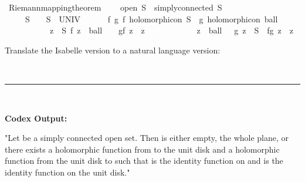 \documentclass{article}
\begin{document}
\begin{boxB}
\begin{isabelle}
\isamarkupfalse \ Riemann{\isacharunderscore}{\kern0pt}mapping{\isacharunderscore}{\kern0pt}theorem{\isacharcolon}{\kern0pt}\isanewline
\ \ \ \ {\isachardoublequoteopen}open\ S\ {\isasymand}\ simply{\isacharunderscore}{\kern0pt}connected\ S\ {\isasymlongleftrightarrow}\isanewline
\ \ \ \ \ S\ {\isacharequal}{\kern0pt}\ {\isacharbraceleft}{\kern0pt}{\isacharbraceright}{\kern0pt}\ {\isasymor}\ S\ {\isacharequal}{\kern0pt}\ UNIV\ {\isasymor}\isanewline
\ \ \ \ \ {\isacharparenleft}{\kern0pt}{\isasymexists}f\ g{\isachardot}{\kern0pt}\ f\ holomorphic{\isacharunderscore}{\kern0pt}on\ S\ {\isasymand}\ g\ holomorphic{\isacharunderscore}{\kern0pt}on\ ball\ {}\ {}\ {\isasymand}\isanewline
\ \ \ \ \ \ \ \ \ \ \ {\isacharparenleft}{\kern0pt}{\isasymforall}z\ {\isasymin}\ S{\isachardot}{\kern0pt}\ f\ z\ {\isasymin}\ ball\ {}\ {}\ {\isasymand}\ g{\isacharparenleft}{\kern0pt}f\ z{\isacharparenright}{\kern0pt}\ {\isacharequal}{\kern0pt}\ z{\isacharparenright}{\kern0pt}\ {\isasymand}\isanewline
\ \ \ \ \ \ \ \ \ \ \ {\isacharparenleft}{\kern0pt}{\isasymforall}z\ {\isasymin}\ ball\ {}\ {}{\isachardot}{\kern0pt}\ g\ z\ {\isasymin}\ S\ {\isasymand}\ f{\isacharparenleft}{\kern0pt}g\ z{\isacharparenright}{\kern0pt}\ {\isacharequal}{\kern0pt}\ z{\isacharparenright}{\kern0pt}{\isacharparenright}{\kern0pt}{\isachardoublequoteclose}
\end{isabelle}
Translate the Isabelle version to a natural language version:

\
\hrule
\

\textbf{Codex Output:}

"Let  be a simply connected open set. Then  is either empty, the whole plane, or there exists a holomorphic function  from  to the unit disk and a holomorphic function  from the unit disk to  such that  is the identity function on  and  is the identity function on the unit disk."
\end{boxB}
\end{document}
